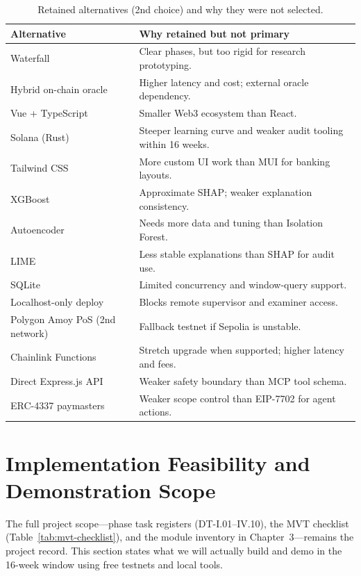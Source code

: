 \documentclass[12pt,a4paper]{report}
\newcommand{\tableheadcolor}{\rowcolor{TableHeadBg}}
\begin{document}
\begin{table}[H]
\centering
\caption[Alternative technology justifications]{Retained alternatives (2nd choice) and why they were not selected.}
\label{tab:tech-justification-alternatives}
\small
\begin{tabular}{@{}p{3.2cm}p{9.8cm}@{}}
\toprule
\tableheadcolor
\textbf{Alternative} & \textbf{Why retained but not primary} \\
\midrule
Waterfall & Clear phases, but too rigid for research prototyping. \\
Hybrid on-chain oracle & Higher latency and cost; external oracle dependency. \\
Vue + TypeScript & Smaller Web3 ecosystem than React. \\
Solana (Rust) & Steeper learning curve and weaker audit tooling within 16 weeks. \\
Tailwind CSS & More custom UI work than MUI for banking layouts. \\
XGBoost & Approximate SHAP; weaker explanation consistency. \\
Autoencoder & Needs more data and tuning than Isolation Forest. \\
LIME & Less stable explanations than SHAP for audit use. \\
SQLite & Limited concurrency and window-query support. \\
Localhost-only deploy & Blocks remote supervisor and examiner access. \\
Polygon Amoy PoS (2nd network) & Fallback testnet if Sepolia is unstable. \\
Chainlink Functions & Stretch upgrade when supported; higher latency and fees. \\
Direct Express.js API & Weaker safety boundary than MCP tool schema. \\
ERC-4337 paymasters & Weaker scope control than EIP-7702 for agent actions. \\
\bottomrule
\end{tabular}
\end{table}


\section{Implementation Feasibility and Demonstration Scope}
\label{sec:impl-feasibility}

The full project scope---phase task registers (DT-I.01--IV.10), the MVT checklist (Table~\ref{tab:mvt-checklist}), and the module inventory in Chapter~3---remains the project record. This section states what we will actually build and demo in the 16-week window using free testnets and local tools.
\end{document}

